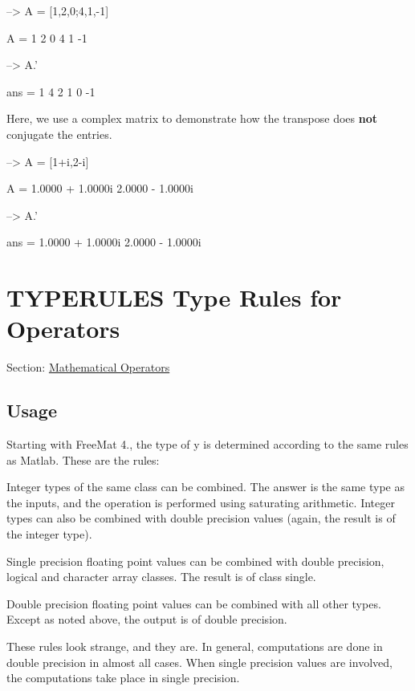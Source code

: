 \begin{DoxyVerbInclude}
--> A = [1,2,0;4,1,-1]

A = 
  1  2  0 
  4  1 -1 

--> A.'

ans = 
  1  4 
  2  1 
  0 -1 
\end{DoxyVerbInclude}


Here, we use a complex matrix to demonstrate how the transpose does {\bfseries not} conjugate the entries.


\begin{DoxyVerbInclude}
--> A = [1+i,2-i]

A = 
   1.0000 +  1.0000i   2.0000 -  1.0000i 

--> A.'

ans = 
   1.0000 +  1.0000i 
   2.0000 -  1.0000i 
\end{DoxyVerbInclude}
 \hypertarget{operators_typerules}{}\section{T\-Y\-P\-E\-R\-U\-L\-E\-S Type Rules for Operators}\label{operators_typerules}
Section\-: \hyperlink{sec_operators}{Mathematical Operators} \hypertarget{vtkwidgets_vtkxyplotwidget_Usage}{}\subsection{Usage}\label{vtkwidgets_vtkxyplotwidget_Usage}
Starting with Free\-Mat 4., the type of {\ttfamily y} is determined according to the same rules as Matlab. These are the rules\-: 
\begin{DoxyEnumerate}
\item Integer types of the same class can be combined. The answer is the same type as the inputs, and the operation is performed using saturating arithmetic. Integer types can also be combined with double precision values (again, the result is of the integer type).  
\item Single precision floating point values can be combined with double precision, logical and character array classes. The result is of class single.  
\item Double precision floating point values can be combined with all other types. Except as noted above, the output is of double precision.  
\end{DoxyEnumerate}These rules look strange, and they are. In general, computations are done in double precision in almost all cases. When single precision values are involved, the computations take place in single precision. 